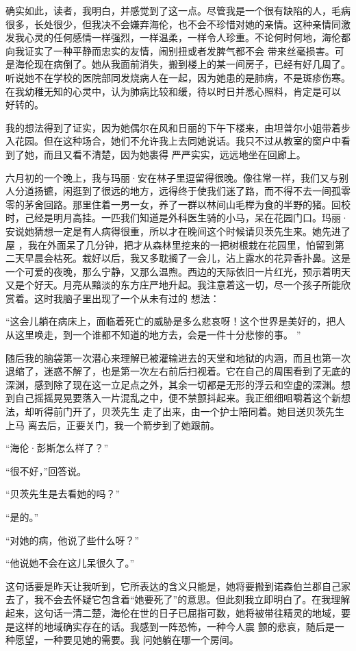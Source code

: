 \documentclass{article}
\begin{document}
确实如此，读者，我明白，并感觉到了这一点。尽管我是一个很有缺陷的人，毛病很多，长处很少，但我决不会嫌弃海伦，也不会不珍惜对她的亲情。这种亲情同激发我心灵的任何感情一样强烈，一样温柔，一样令人珍重。不论何时何地，海伦都向我证实了一种平静而忠实的友情，闹别扭或者发脾气都不会
\newpage
带来丝毫损害。可是海伦现在病倒了。她从我面前消失，搬到楼上的某一间房子，已经有好几周了。听说她不在学校的医院部同发烧病人在一起，因为她患的是肺病，不是斑疹伤寒。在我幼稚无知的心灵中，认为肺病比较和缓，待以时日并悉心照料，肯定是可以
好转的。 

我的想法得到了证实，因为她偶尔在风和日丽的下午下楼来，由坦普尔小姐带着步入花园。但在这种场合，她们不允许我上去同她说话。我只不过从教室的窗户中看到了她，而且又看不清楚，因为她裹得
严严实实，远远地坐在回廊上。 

六月初的一个晚上，我与玛丽·安在林子里逗留得很晚。像往常一样，我们又与别人分道扬镳，闲逛到了很远的地方，远得终于使我们迷了路，而不得不去一间孤零零的茅舍回路。那里住着一男一女，养了一群以林间山毛榉为食的半野的猪。回校时，己经是明月高挂。一匹我们知道是外科医生骑的小马，呆在花园门口。玛丽·安说她猜想一定是有人病得很重，所以才在晚间这个时候请贝茨先生来。她先进了屋
\newpage
，我在外面呆了几分钟，把才从森林里挖来的一把树根栽在花园里，怕留到第二天早晨会枯死。栽好以后，我又多耽搁了一会儿，沾上露水的花异香扑鼻。这是一个可爱的夜晚，那么宁静，又那么温煦。西边的天际依旧一片红光，预示着明天又是个好天。月亮从黯淡的东方庄严地升起。我注意着这一切，尽一个孩子所能欣赏着。这时我脑子里出现了一个从未有过的
想法： 

“这会儿躺在病床上，面临着死亡的威胁是多么悲哀呀！这个世界是美好的，把人从这里唤走，到一个谁都不知道的地方去，会是一件十分悲惨的事。
” 

随后我的脑袋第一次潜心来理解已被灌输进去的天堂和地狱的内涵，而且也第一次退缩了，迷惑不解了，也是第一次左右前后扫视着。它在自己的周围看到了无底的深渊，感到除了现在这一立足点之外，其余一切都是无形的浮云和空虚的深渊。想到自己摇摇晃晃要落入一片混乱之中，便不禁颤抖起来。我正细细咀嚼着这个新想法，却听得前门开了，贝茨先生
\newpage
走了出来，由一个护士陪同着。她目送贝茨先生上马
离去后，正要关门，我一个箭步到了她跟前。 


“海伦·彭斯怎么样了？” 


“很不好，”回答说。 


“贝茨先生是去看她的吗？” 


“是的。” 


“对她的病，他说了些什么呀？” 


“他说她不会在这儿呆很久了。” 

这句话要是昨天让我听到，它所表达的含义只能是，她将要搬到诺森伯兰郡自己家去了，我不会去怀疑它包含着“她要死了”的意思。但此刻我立即明白了。在我理解起来，这句话一清二楚，海伦在世的日子已屈指可数，她将被带往精灵的地域，要是这样的地域确实存在的话。我感到一阵恐怖，一种今人震
\newpage
颤的悲哀，随后是一种愿望，一种要见她的需要。我
问她躺在哪一个房间。 
\end{document}
